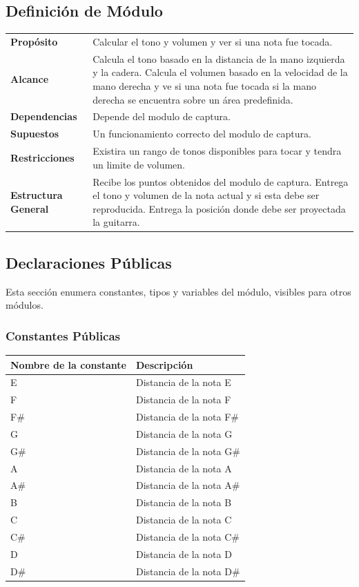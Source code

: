 \documentclass[a4paper,10pt]{article}
\begin{document}
\subsection{Definición de Módulo}
\begin{tabularx}{\textwidth}{p{25mm} X}
        \textbf{Propósito} & Calcular el tono y volumen y ver si una nota fue tocada.\\
        \textbf{Alcance} & Calcula el tono basado en la distancia de la mano izquierda y la cadera. Calcula el volumen basado en la velocidad de la mano derecha y ve si una nota fue tocada si la mano derecha se encuentra sobre un área predefinida.\\
        \textbf{Dependencias} & Depende del modulo de captura.\\
        \textbf{Supuestos} & Un funcionamiento correcto del modulo de captura.\\
        \textbf{Restricciones} & Existira un rango de tonos disponibles para tocar y tendra un limite de volumen.\\
        \textbf{Estructura General} & Recibe los puntos obtenidos del modulo de captura. Entrega el tono y volumen de la nota actual y si esta debe ser reproducida. Entrega la posición donde debe ser proyectada la guitarra. \\
\end{tabularx}
\subsection{Declaraciones Públicas}
Esta sección enumera constantes, tipos y variables del módulo, visibles para
otros módulos.
\subsubsection{Constantes Públicas}
\begin{tabular}{| p{30mm} | p{10cm} |}
        \hline
        \textbf{Nombre de la \mbox{constante}} & \textbf{Descripción} \\
        \hline
        E & Distancia de la nota E\\
        F & Distancia de la nota F\\
        F\# & Distancia de la nota F\#\\
        G & Distancia de la nota G\\
        G\# & Distancia de la nota G\#\\
        A & Distancia de la nota A\\
        A\# & Distancia de la nota A\#\\
        B & Distancia de la nota B\\
        C & Distancia de la nota C\\
        C\# & Distancia de la nota C\#\\
        D & Distancia de la nota D\\
        D\# & Distancia de la nota D\#\\
        \hline
\end{tabular}
\end{document}
